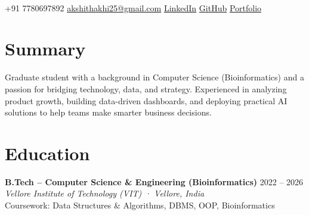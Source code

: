 \documentclass[10pt, letterpaper]{article}
\newcommand{\rolerow}[3]{%
  \textbf{#1} \hfill {\small\color{light}#3}\\[-1pt]
  {\small\color{mid}\textit{#2}}%
}
\begin{document}
\enlargethispage{3\baselineskip}

{\centering
  {\LARGE\bfseries{}\selectfont{}}\\[1pt]
  {\small\color{light}
    {\color{accent}\faPhone*}\hspace{2pt} +91 7780697892 \quad\textbullet\quad
    {\color{accent}\faEnvelope}\hspace{2pt} \href{mailto:akshithakhi25@gmail.com}{akshithakhi25@gmail.com} \quad\textbullet\quad
    {\color{accent}\faLinkedin}\hspace{2pt} \href{https://www.linkedin.com/in/akshithpachipulusu}{LinkedIn} \quad\textbullet\quad
    {\color{accent}\faGithub}\hspace{2pt} \href{https://github.com/akhiakshith}{GitHub} \quad\textbullet\quad
    {\color{accent}\faGlobe}\hspace{2pt} \href{https://akshith-portfolio-tau.vercel.app}{Portfolio}
  }\\[0pt]
\par}

\section{Summary}
{\small Graduate student with a background in Computer Science (Bioinformatics) and a passion for bridging technology, data, and strategy. Experienced in analyzing product growth, building data-driven dashboards, and deploying practical AI solutions to help teams make smarter business decisions.}

\section{Education}

\rolerow{B.Tech – Computer Science \& Engineering (Bioinformatics)}%
        {Vellore Institute of Technology (VIT) · Vellore, India}%
        {2022 – 2026}\\[1pt]
{\small\color{light}Coursework: Data Structures \& Algorithms, DBMS, OOP, Bioinformatics}
\end{document}
